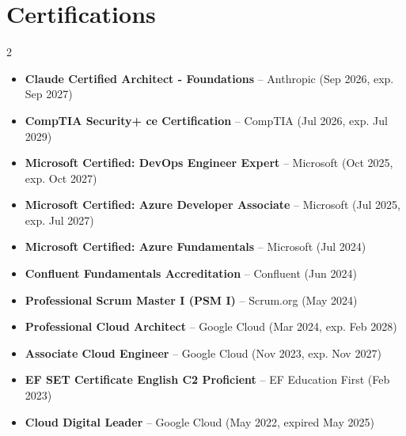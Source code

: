 \documentclass[10pt, a4paper]{article}
\begin{document}
\section{Certifications}
\begin{multicols}{2}
\begin{itemize}[leftmargin=10pt, itemsep=3pt, parsep=0pt, topsep=2pt]
    \item \textbf{Claude Certified Architect - Foundations} -- Anthropic (Sep 2026, exp. Sep 2027)
    \item \textbf{CompTIA Security+ ce Certification} -- CompTIA (Jul 2026, exp. Jul 2029)
    \item \textbf{Microsoft Certified: DevOps Engineer Expert} -- Microsoft (Oct 2025, exp. Oct 2027)
    \item \textbf{Microsoft Certified: Azure Developer Associate} -- Microsoft (Jul 2025, exp. Jul 2027)
    \item \textbf{Microsoft Certified: Azure Fundamentals} -- Microsoft (Jul 2024)
    \item \textbf{Confluent Fundamentals Accreditation} -- Confluent (Jun 2024)
    \item \textbf{Professional Scrum Master I (PSM I)} -- Scrum.org (May 2024)
    \item \textbf{Professional Cloud Architect} -- Google Cloud (Mar 2024, exp. Feb 2028)
    \item \textbf{Associate Cloud Engineer} -- Google Cloud (Nov 2023, exp. Nov 2027)
    \item \textbf{EF SET Certificate English C2 Proficient} -- EF Education First (Feb 2023)
    \item \textbf{Cloud Digital Leader} -- Google Cloud (May 2022, expired May 2025)
\end{itemize}
\end{multicols}

\end{document}
